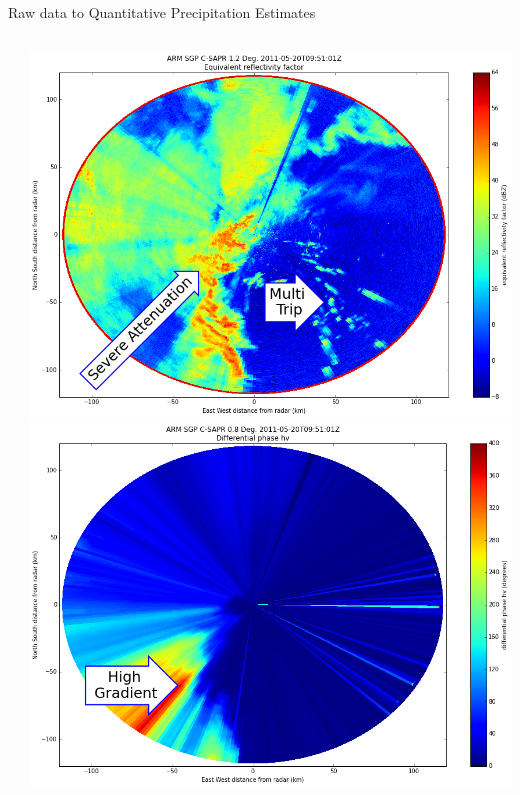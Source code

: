 \documentclass[final]{beamer}
\begin{document}
\begin{frame}{}
\begin{columns}[t]
\begin{column}{.3\linewidth}
\begin{block}{Raw data to Quantitative Precipitation Estimates}
\begin{columns}[t]
\begin{column}{.4\linewidth}
\begin{itemize}
		\end{itemize}
		\end{column}
                \begin{column}{.6\linewidth}
                \begin{columns}[t]
                \begin{column}{.5\linewidth}
                		\includegraphics[width=1.0\linewidth]{figures/ze.png}\\[1ex]  %
           		\includegraphics[width=1.0\linewidth]{figures/phidp_f.png}\\[1ex]   %

\end{column}
\end{columns}
\end{column}
\end{columns}
\end{block}
\end{column}
\end{columns}
\end{frame}
\end{document}
